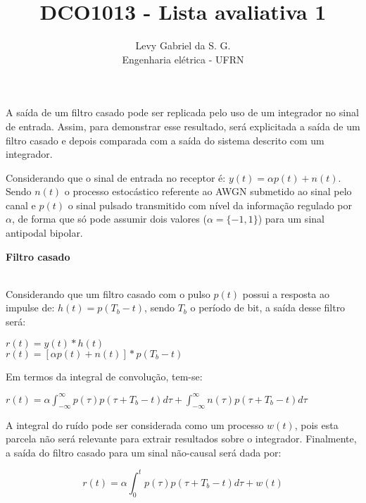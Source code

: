 \title{DCO1013 - Lista avaliativa 1}
\author{Levy Gabriel da S. G. \\ Engenharia elétrica - UFRN}

\maketitle
\thispagestyle{fancy}

A saída de um filtro casado pode ser replicada pelo uso de um integrador no sinal de entrada. Assim, para demonstrar esse resultado, será explicitada a saída de um filtro casado e depois comparada com a saída do sistema descrito com um integrador.

Considerando que o sinal de entrada no receptor é: $y(t) = \alpha p(t) + n(t)$. Sendo $n(t)$ o processo estocástico referente ao AWGN submetido ao sinal pelo canal e $p(t)$ o sinal pulsado transmitido com nível da informação regulado por $\alpha$, de forma que só pode assumir dois valores ($\alpha = \{-1,1\}$) para um sinal antipodal bipolar.

\large \textbf{Filtro casado}
\normalsize

\\

Considerando que um filtro casado com o pulso $p(t)$ possui a resposta ao impulse de: $h(t) = p(T_b - t)$, sendo $T_b$ o período de bit, a saída desse filtro será:

\begin{center}
    $ r(t) = y(t) \ast h(t)$ \\ \vspace{1pt}
    $ r(t) = [\alpha p(t) + n(t)] \ast p(T_b - t)$ 
\end{center}

Em termos da integral de convolução, tem-se:
\begin{center}
    $ r(t) = \alpha \int_{-\infty}^{\infty} p(\tau)p(\tau+T_b-t) d\tau + \int_{-\infty}^{\infty} n(\tau)p(\tau+T_b-t)d\tau$
\end{center}

A integral do ruído pode ser considerada como um processo $w(t)$, pois esta parcela não será relevante para extrair resultados sobre o integrador. Finalmente, a saída do filtro casado para um sinal não-causal será dada por:

\begin{equation} \label{MF:out}
    r(t) = \alpha \int_{0}^{t} p(\tau)p(\tau+T_b-t) d\tau + w(t)
\end{equation}


